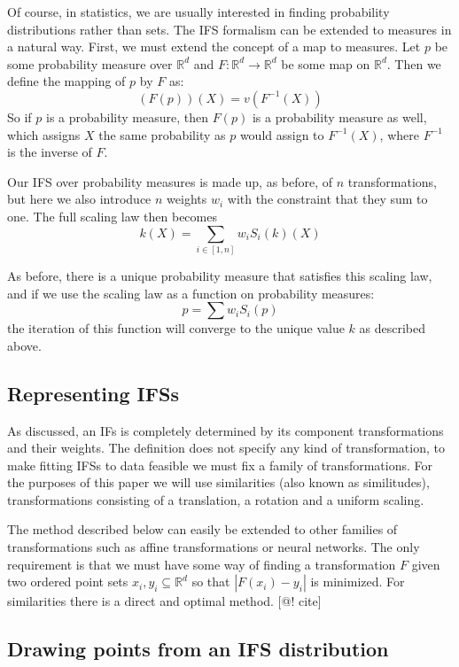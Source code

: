 \documentclass[11pt]{article}
\theoremstyle{definition}
\begin{document}
Of course, in statistics, we are usually interested in finding probability distributions rather than sets. The IFS formalism can be extended to measures in a natural way. First, we must extend the concept of a map to measures. Let $p$ be some probability measure over ${\mathbb R}^d$ and $F:{\mathbb R}^d \rightarrow {\mathbb R}^d$ be some map on ${\mathbb R}^d$. Then we define the mapping of $p$ by $F$ as:
\[
(F(p))(X) = v(F^{-1}(X))
\]
So if $p$ is a probability measure, then $F(p)$ is a probability measure as well, which assigns $X$ the same probability as $p$ would assign to $F^{-1}(X)$, where $F^{-1}$ is the inverse of $F$.

Our IFS over probability measures is made up, as before, of $n$ transformations, but here we also introduce $n$ weights $w_i$ with the constraint that they sum to one. The full scaling law then becomes
\[
k(X) = \sum_{i\in[1, n]} w_i S_i(k)(X)
\] 

As before, there is a unique probability measure that satisfies this scaling law, and if we use the scaling law as a function on probability measures:
\[
p = \sum w_i S_i(p)
\]
the iteration of this function will converge to the unique value $k$ as described above.

\subsection{Representing IFSs}

As discussed, an IFs is completely determined by its component transformations and their weights. The definition does not specify any kind of transformation, to make fitting IFSs to data feasible we must fix a family of transformations. For the purposes of this paper we will use similarities (also known as similitudes), transformations consisting of a translation, a rotation and a uniform scaling.

The method described below can easily be extended to other families of transformations such as affine transformations or neural networks. The only requirement is that we must have some way of finding a transformation $F$ given two ordered point sets ${x_i}, {y_i} \subseteq {\mathbb R}^d$ so that $|F(x_i) - y_i|$ is minimized. For similarities there is a direct and optimal method. [@! cite]

\subsection{Drawing points from an IFS distribution}
\end{document}
